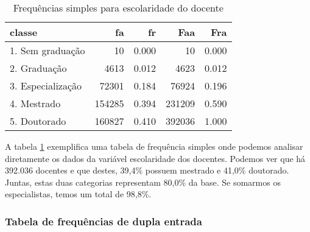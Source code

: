 \documentclass[11pt,]{style/krantz}
\makeatletter
\newenvironment{Shaded}{\begin{snugshade}}{\end{snugshade}}
\newcommand{\DataTypeTok}[1]{\textcolor[rgb]{0.13,0.29,0.53}{#1}}
\newcommand{\DecValTok}[1]{\textcolor[rgb]{0.00,0.00,0.81}{#1}}
\newcommand{\KeywordTok}[1]{\textcolor[rgb]{0.13,0.29,0.53}{\textbf{#1}}}
\newcommand{\NormalTok}[1]{#1}
\newcommand{\OperatorTok}[1]{\textcolor[rgb]{0.81,0.36,0.00}{\textbf{#1}}}
\newcommand{\OtherTok}[1]{\textcolor[rgb]{0.56,0.35,0.01}{#1}}
\newcommand{\StringTok}[1]{\textcolor[rgb]{0.31,0.60,0.02}{#1}}
\newenvironment{kframe}{%
\medskip{}
\setlength{\fboxsep}{.8em}
 \def\at@end@of@kframe{}%
 \ifinner\ifhmode%
  \def\at@end@of@kframe{\end{minipage}}%
  \begin{minipage}{\columnwidth}%
 \fi\fi%
 \def\FrameCommand##1{\hskip\@totalleftmargin \hskip-\fboxsep
 \colorbox{shadecolor}{##1}\hskip-\fboxsep
     \hskip-\linewidth \hskip-\@totalleftmargin \hskip\columnwidth}%
 \MakeFramed {\advance\hsize-\width
   \@totalleftmargin\z@ \linewidth\hsize
   \@setminipage}}%
 {\par\unskip\endMakeFramed%
 \at@end@of@kframe}
\renewenvironment{Shaded}{\begin{kframe}}{\end{kframe}}
\theoremstyle{definition}
\theoremstyle{definition}
\theoremstyle{definition}
\theoremstyle{remark}
\makeatother
\begin{document}
\begin{Shaded}
\end{Shaded}

\begin{table}[!h]

\caption{\label{tab:tab04}Frequências simples para escolaridade do docente}
\centering
\begin{tabular}{lrrrr}
\toprule
classe & fa & fr & Faa & Fra\\
\midrule
1. Sem graduação & 10 & 0.000 & 10 & 0.000\\
2. Graduação & 4613 & 0.012 & 4623 & 0.012\\
3. Especialização & 72301 & 0.184 & 76924 & 0.196\\
4. Mestrado & 154285 & 0.394 & 231209 & 0.590\\
5. Doutorado & 160827 & 0.410 & 392036 & 1.000\\
\bottomrule
\end{tabular}
\end{table}

A tabela \ref{tab:tab04} exemplifica uma tabela de frequência simples onde podemos analisar diretamente os dados da variável escolaridade dos docentes. Podemos ver que há 392.036 docentes e que destes, 39,4\% possuem mestrado e 41,0\% doutorado. Juntas, estas duas categorias representam 80,0\% da base. Se somarmos os especialistas, temos um total de 98,8\%.

\hypertarget{tabela-de-frequencias-de-dupla-entrada}{%
\subsubsection{Tabela de frequências de dupla entrada}\label{tabela-de-frequencias-de-dupla-entrada}}
\end{document}
